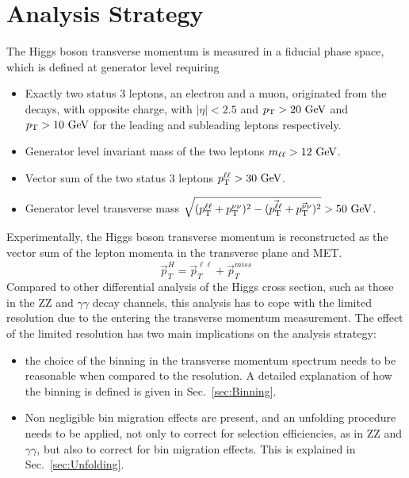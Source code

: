 \section{Analysis Strategy}
\label{sec:AnalysisStrategy}
The Higgs boson transverse momentum is measured in a fiducial phase space, which is defined at generator level requiring
\begin{itemize}
\item Exactly two status 3 leptons, an electron and a muon, originated from the \hwwllnn decays, with opposite charge, with $|\eta|<2.5$ and $p_\mathrm{T}>20~\mathrm{GeV}$ and $p_\mathrm{T}>10~\mathrm{GeV}$ for the leading and subleading leptons respectively.%
\item Generator level invariant mass of the two leptons $m_{\ell\ell}>12~\mathrm{GeV}$.
\item Vector sum of the two status 3 leptons $p_\mathrm{T}^{\ell\ell}>30~\mathrm{GeV}$.
\item Generator level transverse mass $\sqrt{(p_\mathrm{T}^{\ell\ell}+p_\mathrm{T}^{\nu\nu})^2 - (\vec{p_\mathrm{T}^{\ell\ell}}+\vec{p_\mathrm{T}^{\nu\nu}})^2}>50~\mathrm{GeV}$.

\end{itemize}
Experimentally, the Higgs boson transverse momentum is reconstructed as the vector sum of the lepton momenta in the transverse plane and MET.
\begin{equation}
\vec{p}_T^H = \vec{p}_T^{\ell\ell} + \vec{p}_T^{miss}
\end{equation}
Compared to other differential analysis of the Higgs cross section, such as those in the ZZ and $\gamma\gamma$ decay channels, this analysis has to cope with the limited resolution due to the \MET entering the transverse momentum measurement.
The effect of the limited \MET resolution has two main implications on the analysis strategy:
\begin{itemize}
\item the choice of the binning in the transverse momentum spectrum needs to be reasonable when compared to the resolution. A detailed explanation of how the binning is defined is given in Sec.~\ref{sec:Binning}.
\item Non negligible bin migration effects are present, and an unfolding procedure needs to be applied, not only to correct for selection efficiencies, as in ZZ and $\gamma\gamma$, but also to correct for bin migration effects. This is explained in Sec.~\ref{sec:Unfolding}.
\end{itemize}

